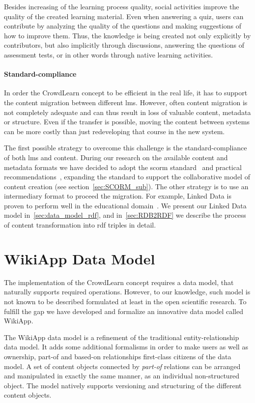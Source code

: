 \documentclass[PhD, Submit, ngerman,UKenglish,table]{scrbook}
\begin{document}
Besides increasing of the learning process quality, social activities improve the quality of the created learning material.
Even when answering a quiz, users can contribute by analyzing the quality of the questions and making suggestions of how to improve them.
Thus, the knowledge is being created not only explicitly by contributors, but also implicitly through discussions, answering the questions of assessment tests, or in other words through native learning activities.

\paragraph{Standard-compliance}
In order the CrowdLearn concept to be efficient in the real life, it has to support the content migration between different \gls{lms}.
However, often content migration is not completely adequate and can thus result in loss of valuable content, metadata or structure.
Even if the transfer is possible, moving the content between systems can be more costly than just redeveloping that course in the new system.

The first possible strategy to overcome this challenge is the standard-compliance of both \gls{lms} and content.
During our research on the available content and metadata formats we have decided to adopt the \gls{scorm} standard~\cite{scorm_specification2011} and practical recommendations~\cite{scorm2011}, expanding the standard to support the collaborative model of content creation (see section~\ref{sec:SCORM_sub}).
The other strategy is to use an intermediary format to proceed the migration.
For example, Linked Data is proven to perform well in the educational domain~\cite{guy2014linkedup}.  
We present our Linked Data model in~\autoref{sec:data_model_rdf}, and in~\autoref{sec:RDB2RDF} we describe the process of content transformation into \gls{rdf} triples in detail.



\section{WikiApp Data Model}
\label{sec:wikiapp}
The implementation of the CrowdLearn concept requires a data model, that naturally supports required operations. 
However, to our knowledge, such model is not known to be described formulated at least in the open scientific research.
To fulfill the gap we have developed and formalize an innovative data model called WikiApp.

The WikiApp data model is a refinement of the traditional entity-relationship data model.
It adds some additional formalisms in order to make users as well as ownership, part-of and based-on relationships first-class citizens of the data model.
A set of content objects connected by \emph{part-of} relations can be arranged and manipulated in exactly the same manner, as an individual non-structured object.
The model natively supports versioning and structuring of the different content objects.
\end{document}
